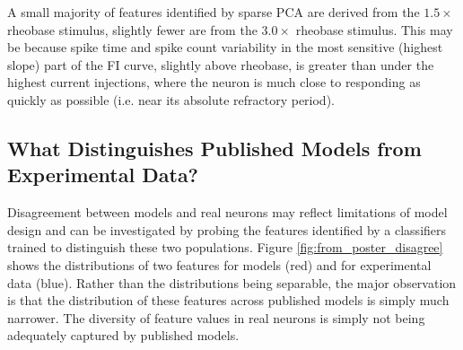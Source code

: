 


A small majority of features identified by sparse PCA are derived from the $1.5 \times$ rheobase stimulus, slightly fewer are from the $3.0\times$ rheobase stimulus.
This may be because spike time and spike count variability in the most sensitive (highest slope) part of the FI curve, slightly above rheobase, is greater than under the highest current injections, where the neuron is much close to responding as quickly as possible (i.e. near its absolute refractory period).

\subsection{What Distinguishes Published Models from Experimental Data?}
Disagreement between models and real neurons may reflect limitations of model design and can be investigated by probing the features identified by a classifiers trained to distinguish these two populations. 
Figure \ref{fig:from_poster_disagree} shows the distributions of two features for models (red) and for experimental data (blue).
Rather than the distributions being separable, the major observation is that the distribution of these features across published models is simply much narrower.
The diversity of feature values in real neurons is simply not being adequately captured by published models.


